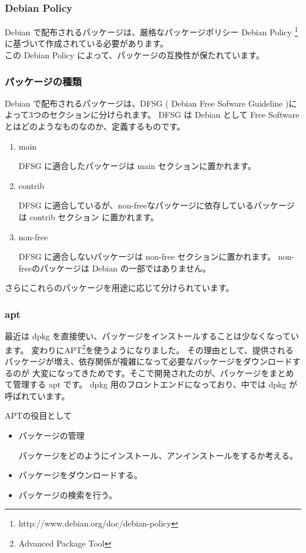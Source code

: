 \documentclass[mingoth,a4paper]{jsarticle}
\begin{document}
\subsubsection{Debian Policy}

	Debian で配布されるパッケージは、厳格なパッケージポリシー Debian Policy 
	\footnote{http://www.debian.org/doc/debian-policy} に基づいて作成されている必要があります。\\
	この Debian Policy によって、パッケージの互換性が保たれています。

\subsubsection{パッケージの種類}
	Debian で配布されるパッケージは、DFSG ( Debian Free Sofware Guideline )によって3つのセクションに分けられます。
	DFSG は Debian として Free Software とはどのようなものなのか、定義するものです。

	\begin{enumerate}
		\item main

			DFSG に適合したパッケージは main セクションに置かれます。
		\item contrib

			DFSG に適合しているが、non-freeなパッケージに依存しているパッケージは contrib セクション
			に置かれます。
		\item non-free

			DFSG に適合しないパッケージは non-free セクションに置かれます。
			non-freeのパッケージは Debian の一部ではありません。
	\end{enumerate}

	 さらにこれらのパッケージを用途に応じて分けられています。

	
\subsubsection{apt}

	最近は dpkg を直接使い、パッケージをインストールすることは少なくなっています。
	変わりにAPT\footnote{Advanced Package Tool}を使うようになりました。
	その理由として、提供されるパッケージが増え、依存関係が複雑になって必要なパッケージをダウンロードするのが
	大変になってきためです。そこで開発されたのが、パッケージをまとめて管理する apt です。
	dpkg 用のフロントエンドになっており、中では dpkg が呼ばれています。
	
	APTの役目として
	\begin{itemize}
		\item パッケージの管理

			パッケージをどのようにインストール、アンインストールをするか考える。
		\item パッケージをダウンロードする。
		\item パッケージの検索を行う。
	\end{itemize}
\end{document}
